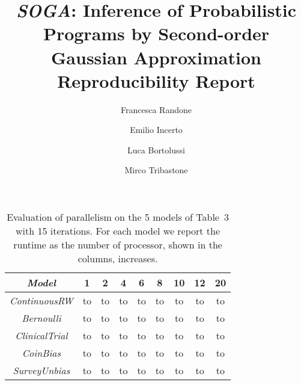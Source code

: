 \documentclass[a4paper]{llncs}
\newcommand{\soga}{\textsl{SOGA}}
\begin{document}
\mainmatter

\title{\soga: Inference of Probabilistic Programs by Second-order Gaussian Approximation Reproducibility Report}


\author{Francesca Randone  \and Emilio Incerto  \and Luca Bortolussi  \and Mirco Tribastone}

\allowdisplaybreaks[0]

\maketitle
\setcounter{table}{4}
\begin{table}[t]
\caption{Evaluation of parallelism on the 5 models of Table~3 with 15 iterations. For each model we report the runtime as the number of processor, shown in the columns, increases.}
    \label{tab:parallel}
    \centering
    \begin{tabular}{ccccccccc}
\toprule
\emph{Model} & 1 & 2 & 4 & 6 & 8 & 10 & 12 & 20 \\
\midrule
\emph{ContinuousRW} & to& to& to& to& to& to& to& to \\
\emph{Bernoulli} & to& to& to& to& to& to& to& to \\
\emph{ClinicalTrial} & to& to& to& to& to& to& to& to \\
\emph{CoinBias} & to& to& to& to& to& to& to& to \\
\emph{SurveyUnbias} & to& to& to& to& to& to& to& to \\
\bottomrule
\end{tabular}
\end{table}
\end{document}
